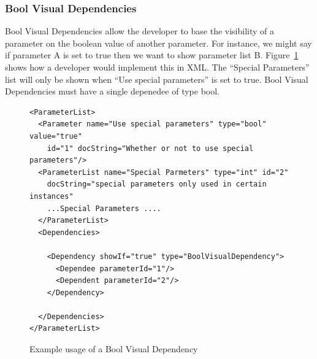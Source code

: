 \subsubsection{Bool Visual Dependencies}
Bool Visual Dependencies allow the developer to base the visibility of a parameter on the boolean value of another parameter. For instance, we might say
if parameter A is set to true then we want to show parameter list B. Figure~\ref{BoolVisXML} shows how a developer would implement this in XML. The
``Special Parameters'' list will only be shown when ``Use special parameters'' is set to true. Bool Visual Dependencies must have a single depenedee of type bool.
\begin{figure}
\centering
{\footnotesize
\begin{verbatim}
<ParameterList>
  <Parameter name="Use special parameters" type="bool" value="true"
    id="1" docString="Whether or not to use special parameters"/>
  <ParameterList name="Special Parmeters" type="int" id="2"
    docString="special parameters only used in certain instances" 
    ...Special Parameters ....
  </ParameterList>
  <Dependencies>

    <Dependency showIf="true" type="BoolVisualDependency">
      <Dependee parameterId="1"/>
      <Dependent parameterId="2"/>
    </Dependency>

  </Dependencies>
</ParameterList>
\end{verbatim}
}
\caption{Example usage of a Bool Visual Dependency}
\label{BoolVisXML}
\end{figure}

